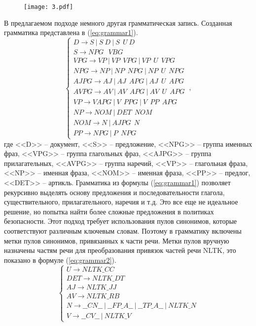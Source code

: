 \documentclass[../main]{subfiles}
\begin{document}
\begin{figure}[H]
    \centering
    {\texttt{[image: 3.pdf]}}
    \vspace{-\baselineskip}
\end{figure}

В предлагаемом подходе немного другая грамматическая запись. Созданная грамматика представлена в (\ref{eq:grammar1}).
\begin{equation}
    \label{eq:grammar1}
    \left\{ 
        \begin{array}{l}
            D \rightarrow S\ |\ S\ D\ |\ S\ \ U\ D\ \\
            S \rightarrow NPG\ \ \ VBG \\
            VPG \rightarrow VP\ |\ VP\ \ VPG\ |\ VP\ \ U\ \ VPG \\
            NPG \rightarrow NP\ |\ NP\ \ NPG\ |\ NP\ \ U\ \ NPG \\
            AJPG \rightarrow AJ\ |\ AJ\ \ APG\ |\ AJ\ \ U\ \ APG \\
            AVPG \rightarrow AV\ |\ AV\ \ APG\ |\ AV\ \ U\ \ APG \\
            VP \rightarrow V APG\ |\ V\ \ PPG\ |\ V\ \ PP\ \ APG \\
            NP \rightarrow NOM\ |\ DET\ \ NOM \\
            NOM \rightarrow N\ |\ AJPG\ \ N \\
            PP \rightarrow NPG\ |\ P\ \ NPG
        \end{array}
    \right.\ ,
\end{equation}
где <<D>> -- документ, <<S>> -- предложение, <<NPG>> -- группа именных фраз, <<VPG>> -- группа глагольных фраз, <<AJPG>> --  группа прилагательных, <<AVPG>> -- группа наречий, <<VP>> -- глагольная фраза, <<NP>> -- именная фраза, <<NOM>> -- именная фраза, <<PP>> -- предлог, <<DET>> -- артикль. Грамматика из формулы (\ref{eq:grammar1}) позволяет рекурсивно выделять основу предложения и последовательности глагола, существительного, прилагательного, наречия и т.д. Это все еще не идеальное решение, но попытка найти более сложные предложения в политиках безопасности. Этот подход требует использования пулов синонимов, которые соответствуют различным ключевым словам. Поэтому в грамматику включены метки пулов синонимов, привязанных к части речи. Метки пулов вручную назначены частям речи для преобразования привязок частей речи NLTK, это показано в формуле (\ref{eq:grammar2}).
\begin{equation}
    \label{eq:grammar2}
    \left\{ 
        \begin{array}{l}
            U \rightarrow NLTK\_CC \\
            DET \rightarrow NLTK\_DT \\
            AJ \rightarrow NLTK\_JJ \\
            AV \rightarrow NLTK\_RB \\
            N \rightarrow \_\_CN\_\_\ |\ \_\_FP\_A\_\_\ |\ \_\_TP\_A\_\_\ |\ NLTK\_N \\
            V \rightarrow \_\_CV\_\_\ |\ NLTK\_V
        \end{array}
    \right. 
\end{equation}
\end{document}
